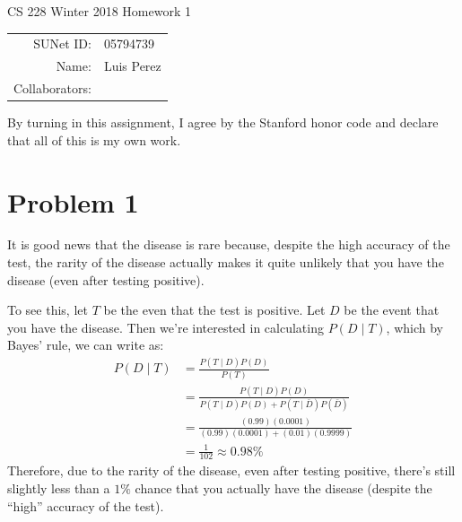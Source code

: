 \documentclass[12pt]{article}
\begin{document}
\begin{center}
{\Large CS 228 Winter 2018 Homework 1}

\begin{tabular}{rl}
SUNet ID: & 05794739 \\
Name: & Luis Perez \\
Collaborators: &
\end{tabular}
\end{center}

By turning in this assignment, I agree by the Stanford honor code and declare
that all of this is my own work.

\section*{Problem 1}
It is good news that the disease is rare because, despite the high accuracy of the test, the rarity of the disease actually makes it quite unlikely that you have the disease (even after testing positive).

To see this, let $T$ be the even that the test is positive. Let $D$ be the event that you have the disease. Then we're interested in calculating $P(D \mid T)$, which by Bayes' rule, we can write as:
\begin{align*}
	P(D \mid T) &= \frac{P(T \mid D)P(D)}{P(T)} \\
	&= \frac{P(T \mid D)P(D)}{P(T \mid D)P(D) + P(T \mid \bar{D})P(\bar{D})} \\
	&= \frac{(0.99)(0.0001)}{(0.99)(0.0001) + (0.01)(0.9999)} \\
	&= \frac{1}{102} \approx 0.98\%
\end{align*}
Therefore, due to the rarity of the disease, even after testing positive, there's still slightly less than a $1\%$ chance that you actually have the disease (despite the ``high'' accuracy of the test).

\pagebreak
\end{document}
